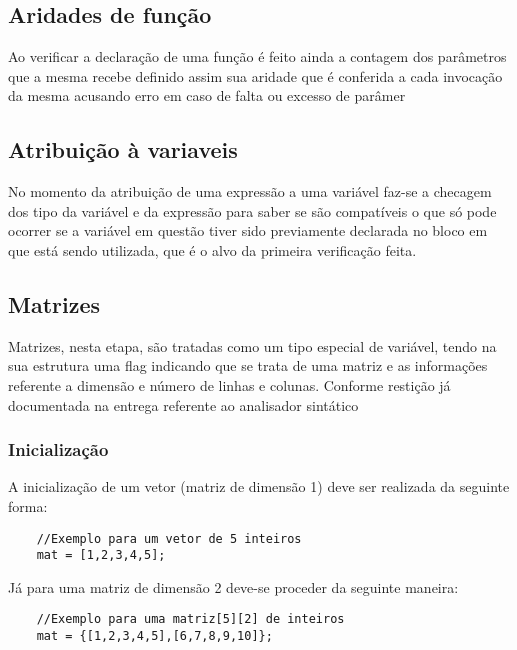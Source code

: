 \documentclass[a4paper,12pt]{report}
\begin{document}
\subsection{Aridades de fun\c{c}\~ao}

Ao verificar a declara\c{c}\~ao de uma fun\c{c}\~ao \'e feito ainda a contagem dos par\^ametros 
que a mesma recebe definido assim sua aridade que \'e conferida a cada invoca\c{c}\~ao da mesma
acusando erro em caso de falta ou excesso de par\^amer

\subsection{Atribui\c{c}\~ao \`a variaveis}

No momento da atribui\c{c}\~ao de uma express\~ao a uma vari\'avel faz-se a checagem dos tipo 
da vari\'avel e da express\~ao para saber se s\~ao compat\'iveis o que s\'o pode ocorrer se a 
vari\'avel em quest\~ao tiver sido previamente declarada no bloco em que est\'a sendo 
utilizada, que \'e o alvo da primeira verifica\c{c}\~ao feita.

\subsection{Matrizes}

Matrizes, nesta etapa, s\~ao tratadas como um tipo especial de vari\'avel, tendo na sua 
estrutura uma flag indicando que se trata de uma matriz e as informa\c{c}\~oes referente a 
dimens\~ao e n\'umero de linhas e colunas. Conforme resti\c{c}\~ao j\'a documentada na entrega
referente ao analisador sint\'atico

\subsubsection{Inicializa\c{c}\~ao}

A inicializa\c{c}\~ao de um vetor (matriz de dimens\~ao 1) deve ser realizada da seguinte 
forma:

\begin{verbatim}
	//Exemplo para um vetor de 5 inteiros
	mat = [1,2,3,4,5];
\end{verbatim}

J\'a para uma matriz de dimens\~ao 2 deve-se proceder da seguinte maneira:

\begin{verbatim}
	//Exemplo para uma matriz[5][2] de inteiros
	mat = {[1,2,3,4,5],[6,7,8,9,10]};
\end{verbatim}
\end{document}
